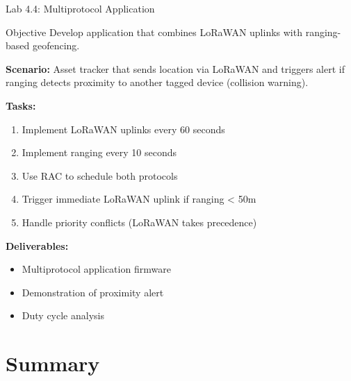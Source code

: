 \documentclass{beamer}
\begin{document}
\begin{frame}{Lab 4.4: Multiprotocol Application}
\begin{block}{Objective}
Develop application that combines LoRaWAN uplinks with ranging-based geofencing.
\end{block}

\textbf{Scenario:}
Asset tracker that sends location via LoRaWAN and triggers alert if ranging detects proximity to another tagged device (collision warning).

\vspace{0.3cm}

\textbf{Tasks:}
\begin{enumerate}
    \item Implement LoRaWAN uplinks every 60 seconds
    \item Implement ranging every 10 seconds
    \item Use RAC to schedule both protocols
    \item Trigger immediate LoRaWAN uplink if ranging < 50m
    \item Handle priority conflicts (LoRaWAN takes precedence)
\end{enumerate}

\vspace{0.3cm}

\textbf{Deliverables:}
\begin{itemize}
    \item Multiprotocol application firmware
    \item Demonstration of proximity alert
    \item Duty cycle analysis
\end{itemize}
\end{frame}

\section{Summary}
\end{document}
